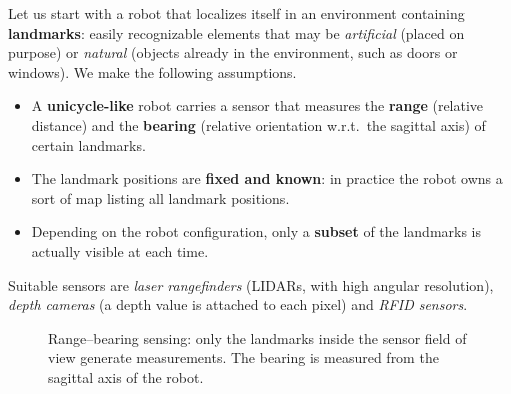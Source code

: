 \documentclass[11pt,a4paper]{article}
\newcommand{\robot}[3][fill=white]{\begin{scope}[shift={(#2)},rotate=#3]\draw[#1,thick] (0.24,0)--(-0.16,0.15)--(-0.16,-0.15)--cycle;\end{scope}}
\theoremstyle{definition}
\theoremstyle{plain}
\theoremstyle{remark}
\begin{document}
Let us start with a robot that localizes itself in an environment containing \textbf{landmarks}: easily recognizable elements that may be \emph{artificial} (placed on purpose) or \emph{natural} (objects already in the environment, such as doors or windows). We make the following assumptions.
\begin{itemize}
  \item A \textbf{unicycle-like} robot carries a sensor that measures the \textbf{range} (relative distance) and the \textbf{bearing} (relative orientation w.r.t.\ the sagittal axis) of certain landmarks.
  \item The landmark positions are \textbf{fixed and known}: in practice the robot owns a sort of map listing all landmark positions.
  \item Depending on the robot configuration, only a \textbf{subset} of the landmarks is actually visible at each time.
\end{itemize}
Suitable sensors are \emph{laser rangefinders} (LIDARs, with high angular resolution), \emph{depth cameras} (a depth value is attached to each pixel) and \emph{RFID sensors}.

\begin{figure}[H]
\centering
{}
\caption{Range--bearing sensing: only the landmarks inside the sensor field of view generate measurements. The bearing is measured from the sagittal axis of the robot.}
\label{fig:fov}
\end{figure}
\end{document}
